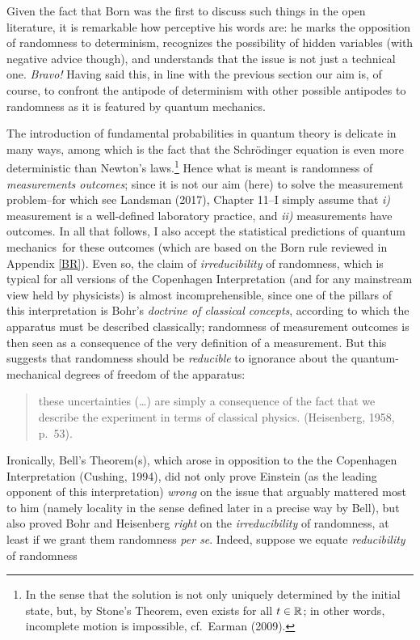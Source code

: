 \documentclass[11pt,a4paper]{article}
\numberwithin{equation}{section}
\newcommand{\qm}{quantum mechanics}
\begin{document}
   Given the fact that Born was the first to discuss such things in the open literature, it is remarkable how perceptive his words are: he marks the opposition of randomness to determinism, recognizes the possibility of hidden variables (with negative advice though), and understands that the issue  is not just a technical one. \emph{Bravo! }Having said this, in line with the previous section our aim is, of course, to confront the antipode of determinism with other possible antipodes to randomness as it is featured by \qm. 
   
The introduction of fundamental probabilities in quantum theory is delicate in many ways, among which is the fact that the Schr\"{o}dinger equation is even more deterministic than Newton's laws.\footnote{\label{STE} In the sense that the solution is not only uniquely determined by the initial state, but, by Stone's Theorem,  even exists for all $t\in{\mathbb R}$; in other words, incomplete motion is impossible, cf.\ Earman (2009).} Hence what is meant  is randomness of \emph{measurements outcomes};
since it is not our aim (here) to solve the measurement problem--for which see Landsman (2017), Chapter 11--I simply assume that \emph{i)} measurement is  a well-defined laboratory practice, and \emph{ii)}  measurements have outcomes. In all that follows, I also accept the statistical predictions of \qm\ for these outcomes (which are based on the Born rule reviewed in Appendix \ref{BR}).
  Even so, the claim of  \emph{irreducibility} of randomness, which is typical for all versions of the  Copenhagen Interpretation (and for any mainstream view held by physicists) is almost  incomprehensible, since one of the pillars of this interpretation is  Bohr's \emph{doctrine of classical concepts}, according to which the apparatus must be described classically;  randomness of measurement outcomes is then seen as a consequence of the very definition of a measurement. But this 
  suggests that randomness should be \emph{reducible} to ignorance about the quantum-mechanical degrees of freedom of the apparatus:
 \begin{quote}\begin{small}  these uncertainties (\ldots) are simply a consequence of the fact that we describe the experiment in terms of classical physics.
(Heisenberg, 1958, p.\ 53).
\end{small}\end{quote} 
Ironically, Bell's Theorem(s), which arose in opposition to the  the Copenhagen Interpretation (Cushing, 1994), did not only prove Einstein (as the leading opponent of this interpretation) \emph{wrong} on the issue that arguably mattered most to him (namely locality in the sense defined later in a precise way by Bell), but also proved Bohr and Heisenberg \emph{right} on the \emph{irreducibility} of randomness, at least if we grant them randomness \emph{per se}. Indeed, suppose we equate  \emph{reducibility} of randomness
\end{document}
